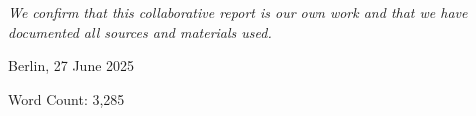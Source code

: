 \chapter*{}
\vspace{17cm}
\hfill\parbox{8cm}{
\raggedleft
	\textit{We confirm that this collaborative report is our own work and that we have documented all sources and materials used.}\par 
	\vspace{1em}
	Berlin, 27 June 2025

	\vspace{3em}
	{\footnotesize Word Count: 3,285}
}
\thispagestyle{plain}